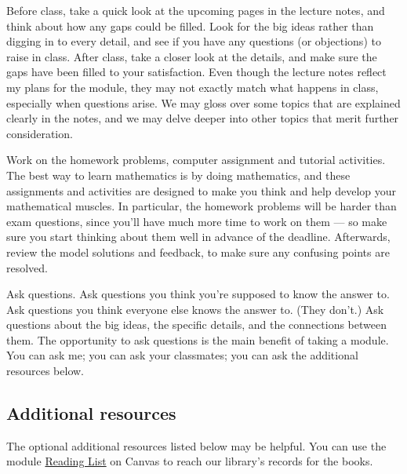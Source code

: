 Before class, take a quick look at the upcoming pages in the lecture notes, and think about how any gaps could be filled.
Look for the big ideas rather than digging in to every detail, and see if you have any questions (or objections) to raise in class.
After class, take a closer look at the details, and make sure the gaps have been filled to your satisfaction.
Even though the lecture notes reflect my plans for the module, they may not exactly match what happens in class, especially when questions arise.
We may gloss over some topics that are explained clearly in the notes, and we may delve deeper into other topics that merit further consideration.

Work on the homework problems, computer assignment and tutorial activities.
The best way to learn mathematics is by doing mathematics, and these assignments and activities are designed to make you think and help develop your mathematical muscles.
In particular, the homework problems will be harder than exam questions, since you'll have much more time to work on them --- so make sure you start thinking about them well in advance of the deadline.
Afterwards, review the model solutions and feedback, to make sure any confusing points are resolved.

Ask questions.
Ask questions you think you're supposed to know the answer to.
Ask questions you think everyone else knows the answer to.
(They don't.)
Ask questions about the big ideas, the specific details, and the connections between them.
The opportunity to ask questions is the main benefit of taking a module.
You can ask me; you can ask your classmates; you can ask the additional resources below.



\subsection*{Additional resources}
The optional additional resources listed below may be helpful.
You can use the module \href{https://canvas.liverpool.ac.uk/courses/76365/external_tools/102}{Reading List} on Canvas to reach our library's records for the books.

